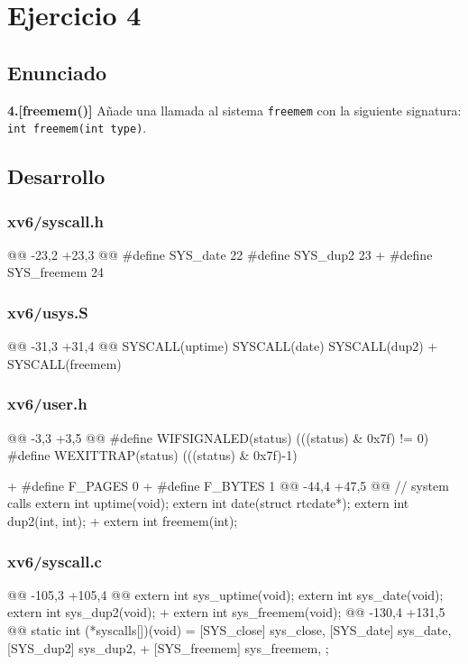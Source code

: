 \section{Ejercicio 4}

\subsection{Enunciado}
\begin{ejer}
    \textbf{4.[freemem()]} Añade una llamada al sistema \texttt{freemem} con la siguiente 
    signatura: \texttt{int freemem(int type)}.
\end{ejer}

\subsection{Desarrollo}

\subsubsection{xv6/syscall.h}
\begin{listing}
@@ -23,2 +23,3 @@
    #define SYS_date   22
    #define SYS_dup2   23
+   #define SYS_freemem 24
\end{listing}

\subsubsection{xv6/usys.S}
\begin{listing}
@@ -31,3 +31,4 @@
    SYSCALL(uptime)
    SYSCALL(date)
    SYSCALL(dup2)
+   SYSCALL(freemem)
\end{listing}

\subsubsection{xv6/user.h}
\begin{listing}
@@ -3,3 +3,5 @@
    #define WIFSIGNALED(status) (((status) & 0x7f) != 0)
    #define WEXITTRAP(status)   (((status) & 0x7f)-1)

+   #define F_PAGES 0
+   #define F_BYTES 1
@@ -44,4 +47,5 @@ 
// system calls
    extern int uptime(void);
    extern int date(struct rtcdate*);
    extern int dup2(int, int);
+   extern int freemem(int);
\end{listing}

\subsubsection{xv6/syscall.c}
\begin{listing}
@@ -105,3 +105,4 @@
    extern int sys_uptime(void);
    extern int sys_date(void);
    extern int sys_dup2(void);
+   extern int sys_freemem(void);
@@ -130,4 +131,5 @@ static int (*syscalls[])(void) = {
    [SYS_close]   sys_close,
    [SYS_date]    sys_date,
    [SYS_dup2]    sys_dup2,
+   [SYS_freemem] sys_freemem,
    };
\end{listing}

